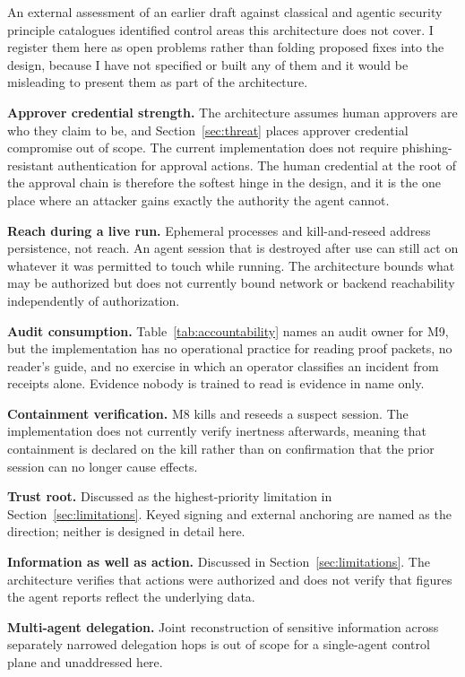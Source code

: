 \documentclass[11pt,letterpaper]{article}
\begin{document}
An external assessment of an earlier draft against classical and agentic security principle catalogues identified control areas this architecture does not cover. I register them here as open problems rather than folding proposed fixes into the design, because I have not specified or built any of them and it would be misleading to present them as part of the architecture.

\textbf{Approver credential strength.} The architecture assumes human approvers are who they claim to be, and Section~\ref{sec:threat} places approver credential compromise out of scope. The current implementation does not require phishing-resistant authentication for approval actions. The human credential at the root of the approval chain is therefore the softest hinge in the design, and it is the one place where an attacker gains exactly the authority the agent cannot.

\textbf{Reach during a live run.} Ephemeral processes and kill-and-reseed address persistence, not reach. An agent session that is destroyed after use can still act on whatever it was permitted to touch while running. The architecture bounds what may be authorized but does not currently bound network or backend reachability independently of authorization.

\textbf{Audit consumption.} Table~\ref{tab:accountability} names an audit owner for M9, but the implementation has no operational practice for reading proof packets, no reader's guide, and no exercise in which an operator classifies an incident from receipts alone. Evidence nobody is trained to read is evidence in name only.

\textbf{Containment verification.} M8 kills and reseeds a suspect session. The implementation does not currently verify inertness afterwards, meaning that containment is declared on the kill rather than on confirmation that the prior session can no longer cause effects.

\textbf{Trust root.} Discussed as the highest-priority limitation in Section~\ref{sec:limitations}. Keyed signing and external anchoring are named as the direction; neither is designed in detail here.

\textbf{Information as well as action.} Discussed in Section~\ref{sec:limitations}. The architecture verifies that actions were authorized and does not verify that figures the agent reports reflect the underlying data.

\textbf{Multi-agent delegation.} Joint reconstruction of sensitive information across separately narrowed delegation hops is out of scope for a single-agent control plane and unaddressed here.
\end{document}
